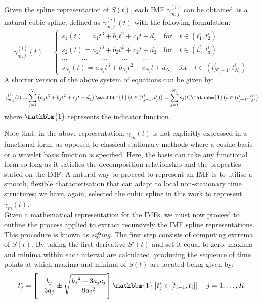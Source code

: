 Given the spline representation of $S(t)$, each IMF $\gamma_{m,j}^{(i)}$ can be obtained as a natural cubic spline, defined as $\gamma_{m,j}^{(i)}(t)$ with the following formulation:
\begin{equation*}
\gamma_{m,j}^{(i)}(t) = \begin{cases}
s_1(t) = a_1 t^3 + b_1 t^2 + c_1 t + d_1 \quad \mbox{for} \quad t \in (t_1^i, t_2^i) \\
s_2(t) = a_2 t^3 + b_2 t^2 + c_2 t + d_2 \quad \mbox{for} \quad t \in (t_2^i, t_3^i)\\
\dots \quad \quad \dots \quad \quad \dots \quad \quad \dots \quad \quad \dots\\
s_{N_i}(t) = a_{N_i} t^3 + b_{N_i} t^2 + c_{N_i} t + d_{N_i} \quad \mbox{for} \quad t \in (t_{{N_i}-1}^i, t_{N_i}^i)
\end{cases}
\end{equation*}
A shorter version of the above system of equations can be given by:
\begin{equation}
\gamma_{m,j}^{(i)}(t) = \sum_{j = 1}^{N_i} \left( a_j t^3 + b_j t^2 + c_j t + d_j \right){\mathbbm{1}} \left( t \in (t_{j-1}^i, t_j^i) \right) = \sum_{j = 1}^{N_i} s_j (t) {\mathbbm{1}} \left( t \in (t_{j-1}^i, t_j^i) \right) 
\end{equation}
where $\mathbbm{1}$ represents the indicator function.

\noindent Note that, in the above representation, $\gamma_m(t)$ is not explicitly expressed in a functional form, as opposed to classical stationary methods where a cosine basis or a wavelet basis function is specified. Here, the basis can take any functional form so long as it satisfies the decomposition relationship and the properties stated on the IMF. A natural way to proceed to represent an IMF is to utilise a smooth, flexible characterisation that can adapt to local non-stationary time structures; we have, again, selected the cubic spline in this work to represent  $\gamma_m(t)$.\\
\noindent Given a mathematical representation for the IMFs, we must now proceed to outline the process applied to extract recursively the IMF spline representations. This procedure is known as \textit{sifting}. The first step consists of computing extrema of $S(t)$. By taking the first derivative $S'(t)$ and set it equal to zero, maxima and minima within each interval are calculated, producing the sequence of time points at which maxima and minima of $S(t)$ are located being given by:
\begin{equation}
\label{t_j}
t^*_{j} = \left[ - \frac{b_j}{3 a_j} \pm \sqrt{\frac{{b_j}^2 - 3a_j c_j}{9 {a_j}^2}} \right] \mathbbm{1} \left[ t^*_{j} \in \left[ t_{i-1},t_i \right] \right] \quad j= 1, \dots, K
\end{equation}

